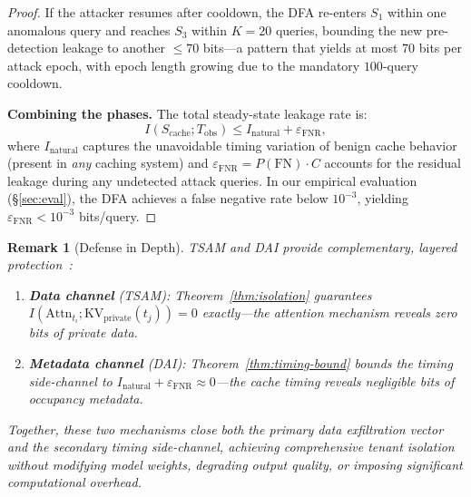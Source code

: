 \documentclass[11pt]{article}
\newtheorem{remark}{Remark}
\begin{document}
\begin{proof}
If the attacker resumes after cooldown, the DFA re-enters $S_1$ within one anomalous
query and reaches $S_3$ within $K = 20$ queries, bounding the new pre-detection leakage
to another $\leq 70$ bits---a pattern that yields at most $70$ bits per attack epoch,
with epoch length growing due to the mandatory $100$-query cooldown.

\medskip
\noindent\textbf{Combining the phases.}
The total steady-state leakage rate is:
\begin{equation}
    I(S_{\mathrm{cache}}; T_{\mathrm{obs}}) \leq I_{\mathrm{natural}} + \varepsilon_{\mathrm{FNR}},
\end{equation}
where $I_{\mathrm{natural}}$ captures the unavoidable timing variation of benign cache
behavior (present in \emph{any} caching system) and
$\varepsilon_{\mathrm{FNR}} = P(\text{FN}) \cdot C$ accounts for the residual leakage
during any undetected attack queries. In our empirical evaluation (\S\ref{sec:eval}),
the DFA achieves a false negative rate below $10^{-3}$, yielding
$\varepsilon_{\mathrm{FNR}} < 10^{-3}$ bits/query.
\end{proof}

\begin{remark}[Defense in Depth]
\label{rem:defense-in-depth}
TSAM and DAI provide complementary, layered protection~\cite{denning1976lattice, goguen1982security}:
\begin{enumerate}[leftmargin=1.5em,itemsep=2pt]
    \item \textbf{Data channel} (TSAM): Theorem~\ref{thm:isolation} guarantees
          $I(\mathrm{Attn}_{t_i}; \mathrm{KV}_{\mathrm{private}}(t_j)) = 0$ exactly---the
          attention mechanism reveals \emph{zero bits} of private data.
    \item \textbf{Metadata channel} (DAI): Theorem~\ref{thm:timing-bound} bounds the
          timing side-channel to $I_{\mathrm{natural}} + \varepsilon_{\mathrm{FNR}}
          \approx 0$---the cache timing reveals \emph{negligible bits} of occupancy
          metadata.
\end{enumerate}
Together, these two mechanisms close both the primary data exfiltration vector and the
secondary timing side-channel, achieving comprehensive tenant isolation without modifying
model weights, degrading output quality, or imposing significant computational overhead.
\end{remark}


\end{document}
